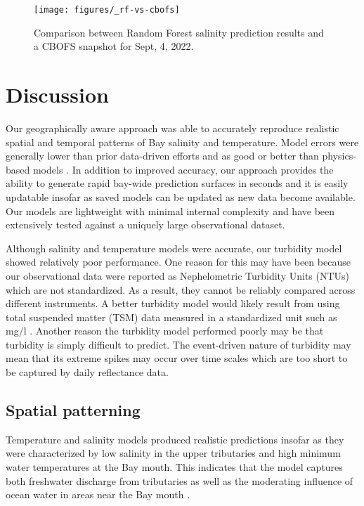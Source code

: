 \documentclass{article}
\begin{document}
\begin{figure}[ht!]
    \begin{center}
          \texttt{[image: figures/\_rf-vs-cbofs]}
          \caption{Comparison between Random Forest salinity prediction results and a CBOFS snapshot for Sept, 4, 2022.}
    \end{center}    
\end{figure}

\section{Discussion}

Our geographically aware approach was able to accurately reproduce realistic spatial and temporal patterns of Bay salinity and temperature. Model errors were generally lower than prior data-driven efforts and as good or better than physics-based models \cite{vogelAssessingSatelliteSea2016}. In addition to improved accuracy, our approach provides the ability to generate rapid bay-wide prediction surfaces in seconds and it is easily updatable insofar as saved models can be updated as new data become available. Our models are lightweight with minimal internal complexity and have been extensively tested against a uniquely large observational dataset.

Although salinity and temperature models were accurate, our turbidity model showed relatively poor performance. One reason for this may have been because our observational data were reported as Nephelometric Turbidity Units (NTUs) which are not standardized. As a result, they cannot be reliably compared across different instruments. A better turbidity model would likely result from using total suspended matter (TSM) data measured in a standardized unit such as mg/l \cite{ondrusekDevelopmentNewOptical2012}. Another reason the turbidity model performed poorly may be that turbidity is simply difficult to predict. The event-driven nature of turbidity may mean that its extreme spikes may occur over time scales which are too short to be captured by daily reflectance data.
 

\subsection{Spatial patterning}

Temperature and salinity models produced realistic predictions insofar as they were characterized by low salinity in the upper tributaries and high minimum water temperatures at the Bay mouth. This indicates that the model captures both freshwater discharge from tributaries as well as the moderating influence of ocean water in areas near the Bay mouth \cite{dingSpatiotemporalPatternsWater2015}.
\end{document}
